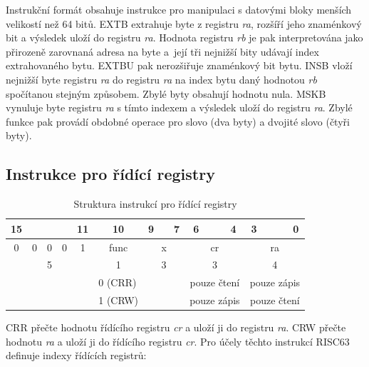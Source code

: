 \documentclass[
  digital, %
  color,   %
  table,   %
  twoside, %
  nolof,   %
  nolot,   %
]{fithesis3}
\begin{document}
Instrukční formát obsahuje instrukce pro manipulaci s datovými bloky menších velikostí než 64 bitů. EXTB extrahuje byte z registru \textit{ra}, rozšíří jeho znaménkový bit a výsledek uloží do registru \textit{ra}. Hodnota registru \textit{rb} je pak interpretována jako přirozeně zarovnaná adresa na byte a~její tři nejnižší bity udávají index extrahovaného bytu. EXTBU pak nerozšiřuje znaménkový bit bytu. INSB vloží nejnižší byte registru \textit{ra} do registru \textit{ra} na index bytu daný hodnotou \textit{rb} spočítanou stejným způsobem. Zbylé byty obsahují hodnotu nula. MSKB vynuluje byte registru \textit{ra} s tímto indexem a výsledek uloží do registru \textit{ra}. Zbylé funkce pak provádí obdobné operace pro slovo (dva byty) a dvojité slovo (čtyři byty).

\subsection{Instrukce pro řídící registry}
\label{subsec:cr}
\begin{table}[H]
\caption{Struktura instrukcí pro řídící registry}
\begin{tabular}{cllllccllccccccc}
15 & \multicolumn{1}{c}{} & \multicolumn{1}{c}{} & \multicolumn{1}{c}{} & \multicolumn{1}{c}{11} & 10 & 9 & \multicolumn{1}{c}{} & \multicolumn{1}{c}{7} & 6 &  & 4 & 3 &  &  & 0 \\ \hline
\multicolumn{1}{|c}{0} & \multicolumn{1}{c}{0} & \multicolumn{1}{c}{0} & \multicolumn{1}{c}{0} & \multicolumn{1}{c|}{1} & \multicolumn{1}{c|}{func} & \multicolumn{3}{c|}{x} & \multicolumn{3}{c|}{cr} & \multicolumn{4}{c|}{ra} \\ \hline
\multicolumn{5}{c}{{\color[HTML]{656565} 5}} & {\color[HTML]{656565} 1} & \multicolumn{3}{c}{{\color[HTML]{656565} 3}} & \multicolumn{3}{c}{{\color[HTML]{656565} 3}} & \multicolumn{4}{c}{{\color[HTML]{656565} 4}} \\
\multicolumn{1}{l}{} &  &  &  &  & \multicolumn{1}{l}{0 (CRR)} & \multicolumn{1}{l}{} &  &  & \multicolumn{3}{c}{pouze čtení} & \multicolumn{4}{c}{pouze zápis} \\
\multicolumn{1}{l}{} &  &  &  &  & \multicolumn{1}{l}{1 (CRW)} & \multicolumn{1}{l}{} &  &  & \multicolumn{3}{c}{pouze zápis} & \multicolumn{4}{c}{pouze čtení}
\end{tabular}
\end{table}

CRR přečte hodnotu řídícího registru \textit{cr} a uloží ji do registru \textit{ra}. CRW přečte hodnotu \textit{ra} a uloží ji do řídícího registru \textit{cr}. Pro účely těchto instrukcí RISC63 definuje indexy řídících registrů:
\end{document}
